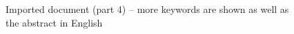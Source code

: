 \begin{figure}[!ht]
  \begin{center}
  \end{center}
  \caption[Imported document (part 4)]{Imported document (part 4) – more keywords are shown as well as the abstract in English}
  \label{fig:divaImport8}
\end{figure}
\FloatBarrier

